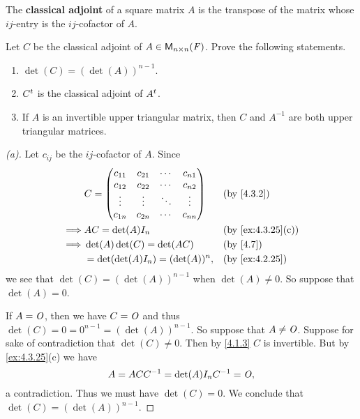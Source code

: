 \begin{defn}\label{4.3.2}
	The \textbf{classical adjoint} of a square matrix \(A\) is the transpose of the matrix whose \(i j\)-entry is the \(i j\)-cofactor of \(A\).
\end{defn}

\setcounter{ex}{26}
\begin{ex}\label{ex:4.3.27}
	Let \(C\) be the classical adjoint of \(A \in \ms[n][n][\F]\).
	Prove the following statements.
	\begin{enumerate}
		\item \(\det(C) = (\det(A))^{n - 1}\).
		\item \({C}^{t}\) is the classical adjoint of \({A}^{t}\).
		\item If \(A\) is an invertible upper triangular matrix, then \(C\) and \(A^{-1}\) are both upper triangular matrices.
	\end{enumerate}
\end{ex}

\begin{proof}[(a)]
	Let \(c_{i j}\) be the \(i j\)-cofactor of \(A\).
	Since
	\begin{align*}
		         & C = \begin{pmatrix}
			               c_{1 1} & c_{2 1} & \cdots & c_{n 1} \\
			               c_{1 2} & c_{2 2} & \cdots & c_{n 2} \\
			               \vdots  & \vdots  & \ddots & \vdots  \\
			               c_{1 n} & c_{2 n} & \cdots & c_{n n}
		               \end{pmatrix} &  & \by{4.3.2}                       \\
		\implies & AC = \det(A) I_n                        &  & \by{ex:4.3.25}[c] \\
		\implies & \det(A) \det(C) = \det(AC)              &  & \by{4.7}          \\
		         & = \det(\det(A) I_n) = (\det(A))^n,      &  & \by{ex:4.2.25}
	\end{align*}
	we see that \(\det(C) = (\det(A))^{n - 1}\) when \(\det(A) \neq 0\).
	So suppose that \(\det(A) = 0\).

	If \(A = \mathit{O}\), then we have \(C = \mathit{O}\) and thus \(\det(C) = 0 = 0^{n - 1} = (\det(A))^{n - 1}\).
	So suppose that \(A \neq \mathit{O}\).
	Suppose for sake of contradiction that \(\det(C) \neq 0\).
	Then by \cref{4.1.3} \(C\) is invertible.
	But by \cref{ex:4.3.25}(c) we have
	\[
		A = A C C^{-1} = \det(A) I_n C^{-1} = \mathit{O},
	\]
	a contradiction.
	Thus we must have \(\det(C) = 0\).
	We conclude that \(\det(C) = (\det(A))^{n - 1}\).
\end{proof}

